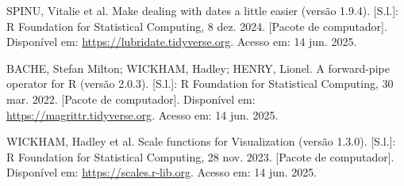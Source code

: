 \begin{thebibliography}{26}
     SPINU, Vitalie et al. Make dealing with dates a little easier (versão 1.9.4). [S.l.]: R Foundation for Statistical Computing, 8 dez. 2024. [Pacote de computador]. Disponível em: 
    \href{https://lubridate.tidyverse.org}{https://lubridate.tidyverse.org}.  
    Acesso em: 14 jun. 2025.
    
     BACHE, Stefan Milton; WICKHAM, Hadley; HENRY, Lionel. A forward-pipe operator for R (versão 2.0.3). [S.l.]: R Foundation for Statistical Computing, 30 mar. 2022. [Pacote de computador]. Disponível em: 
    \href{https://magrittr.tidyverse.org}{https://magrittr.tidyverse.org}.  
    Acesso em: 14 jun. 2025.
    
     WICKHAM, Hadley et al. Scale functions for Visualization (versão 1.3.0). [S.l.]: R Foundation for Statistical Computing, 28 nov. 2023. [Pacote de computador]. Disponível em: 
    \href{https://scales.r-lib.org}{https://scales.r-lib.org}.  
    Acesso em: 14 jun. 2025.

\end{thebibliography}
